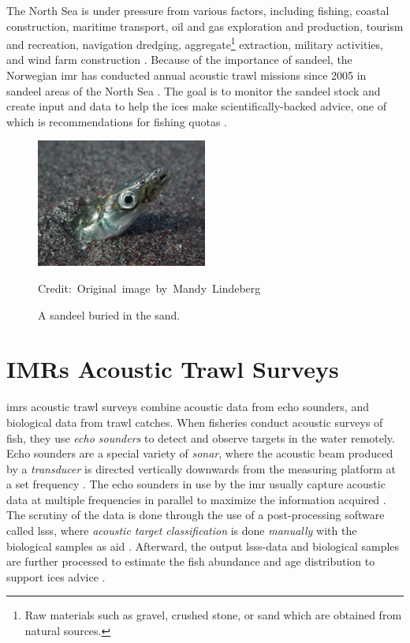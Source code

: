     The North Sea is under pressure from various factors, including fishing, coastal construction, maritime transport, oil and gas exploration and production, tourism and recreation, navigation dredging, aggregate\footnote{Raw materials such as gravel, crushed stone, or sand which are obtained from natural sources.} extraction, military activities, and wind farm construction \cite{ICES2021}. Because of the importance of sandeel, the Norwegian \gls{imr} has conducted annual acoustic trawl missions since 2005 in sandeel areas of the North Sea \cite{johnsen2017collective}. The goal is to monitor the sandeel stock and create input and data to help the \gls{ices} make scientifically-backed advice, one of which is recommendations for fishing quotas \cite{sizedependentfreqrespons2009johnsen}. 
    
    \begin{figure}[H]
        \centering

        \includegraphics[width=0.5\textwidth]{figures/Ammodytes_hexapterus.jpg} 

        \caption[Sandeel]{A sandeel buried in the sand.}
        \medskip 
        \hspace*{15pt}\hbox{\scriptsize Credit: Original image by Mandy Lindeberg \cite{sandeel_image}}
        \label{sandeel_image}
    \end{figure}

\section{IMRs Acoustic Trawl Surveys}
    \gls{imr}s acoustic trawl surveys combine acoustic data from echo sounders, and biological data from trawl catches. When fisheries conduct acoustic surveys of fish, they use \textit{echo sounders} to detect and observe targets in the water remotely. Echo sounders are a special variety of \textit{sonar}, where the acoustic beam produced by a \textit{transducer} is directed vertically downwards from the measuring platform at a set frequency \cite{simmonds2008fisheries}. The echo sounders in use by the \gls{imr} usually capture acoustic data at multiple frequencies in parallel to maximize the information acquired \cite{korneliussen2018acoustic}. The scrutiny of the data is done through the use of a post-processing software called \gls{lsss}, where \textit{acoustic target classification} is done \textit{manually} with the biological samples as aid \cite{korneliussen2006large}. Afterward, the output \gls{lsss}-data and biological samples are further processed to estimate the fish abundance and age distribution to support \gls{ices} advice \cite{johnsen2019stox}. 

